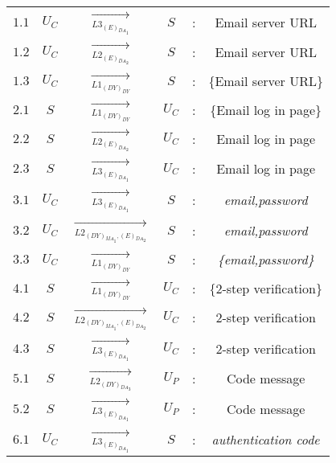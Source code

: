 \begin{center} 
\begin{tabular}{ p{.25cm} c c c c c } 

$1.1$ & $U_C$ & $\xrightarrow[L3_{{(E)}_{{DA}_1}}]{}$ & $S$ & : & Email server URL \\ 

$1.2$ & $U_C$ & $\xrightarrow[L2_{(E)}_{{DA}_2}]{}$ & $S$ & : & Email server URL \\ 

$1.3$ & $U_C$ & $\xrightarrow[L1_{(DY)_{DY}}]{}$ & $S$ & : & \{Email server URL\} \\ 


$2.1$ & $S$ & $\xrightarrow[L1_{(DY)_{DY}}]{}$ & $U_C$ & : & \{Email log in page\} \\ 

$2.2$ & $S$ & $\xrightarrow[L2_{(E)}_{{DA}_2}]{}$ & $U_C$ & : & Email log in page \\ 

$2.3$ & $S$ & $\xrightarrow[L3_{{(E)}_{{DA}_1}}]{}$ & $U_C$ & : & Email log in page \\ 


$3.1$ & $U_C$ & $\xrightarrow[L3_{{(E)}_{{DA}_1}}]{}$ & $S$ & : & \textit{email,password} \\ 

$3.2$ & $U_C$ & $\xrightarrow[L2_{{(DY)}_{{MA}_1},{(E)}_{{DA}_2}}]{}$ & $S$ & : & \textit{email,password} \\ 

$3.3$ & $U_C$ & $\xrightarrow[L1_{(DY)_{DY}}]{}$ & $S$ & : & \textit{\{email,password\}} \\ 


$4.1$ & $S$ & $\xrightarrow[L1_{(DY)_{DY}}]{}$ & $U_C$ & : & \{2-step verification\} \\ 

$4.2$ & $S$ & $\xrightarrow[L2_{{(DY)}_{{MA}_1},{(E)}_{{DA}_2}}]{}$ & $U_C$ & : & 2-step verification \\ 

$4.3$ & $S$ & $\xrightarrow[L3_{{(E)}_{{DA}_1}}]{}$ & $U_C$ & : & 2-step verification\\ 


$5.1$ & $S$ & $\xrightarrow[L2_{{(DY)}_{{DA}_3}}]{}$ & $U_P$ & : & Code message \\ 

$5.2$ & $S$ & $\xrightarrow[L3_{{(E)}_{{DA}_1}}]{}$ & $U_P$ & : & Code message \\ 


$6.1$ & $U_C$ & $\xrightarrow[L3_{{(E)}_{{DA}_1}}]{}$ & $S$ & : & \textit{authentication code} \\ 


\end{tabular}
\end{center}
